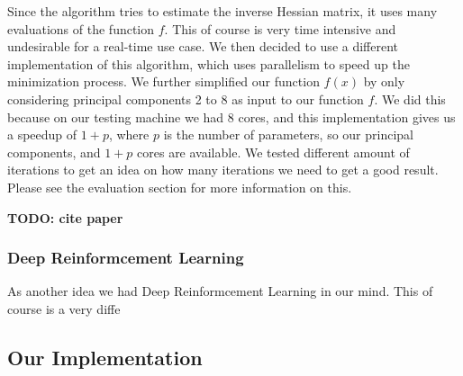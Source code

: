 Since the algorithm tries to estimate the inverse Hessian matrix, it uses many evaluations of the function $f$. This of course is very time intensive and undesirable for a real-time use case. We then decided to use a different 
implementation of this algorithm, which uses parallelism to speed up the minimization process. We further simplified our function $f(x)$ by only considering principal components 2 to 8 as input to our function $f$. We did this because
on our testing machine we had 8 cores, and this implementation gives us a speedup of $1+p$, where $p$ is the number of parameters, so our principal components, and $1+p$ cores are available. We tested different amount of iterations to get an 
idea on how many iterations we need to get a good result. Please see the evaluation section for more information on this.

\textbf{TODO: cite paper}

\subsubsection{Deep Reinformcement Learning}

As another idea we had Deep Reinformcement Learning in our mind. This of course is a very diffe



\subsection{Our Implementation}

